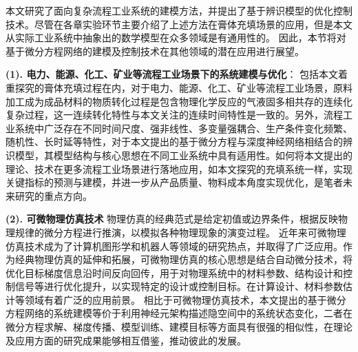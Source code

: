 
本文研究了面向复杂流程工业系统的建模方法，并提出了基于辨识模型的优化控制技术。尽管在各章实验环节主要介绍了上述方法在膏体充填场景的应用，但是本文从实际工业系统中抽象出的数学模型在众多领域是有通用性的。
因此，本节将对基于微分方程网络的建模及控制技术在其他领域的潜在应用进行展望。

\textbf{(1). 电力、能源、化工、矿业等流程工业场景下的系统建模与优化}：
包括本文着重探究的膏体充填过程在内，对于电力、能源、化工、矿业等流程工业场景，原料加工成为成品材料的物质转化过程是包含物理化学反应的气液固多相共存的连续化复杂过程，这一连续转化特性与本文关注的连续时间特性是一致的。另外，流程工业系统中广泛存在不同时间尺度、强非线性、多变量强耦合、生产条件变化频繁、随机性、长时延等特性，对于本文提出的基于微分方程与深度神经网络相结合的辨识模型，其模型结构与核心思想在不同工业系统中具有适用性。如何将本文提出的理论、技术在更多流程工业场景进行落地应用，如本文探究的充填系统一样，实现关键指标的预测与建模，并进一步从产品质量、物料成本角度实现优化，是笔者未来研究的重点方向。

\textbf{(2). 可微物理仿真技术}
物理仿真的经典范式是给定初值或边界条件，根据反映物理规律的微分方程进行推演，以模拟各种物理现象的演变过程。
近年来可微物理仿真技术成为了计算机图形学和机器人等领域的研究热点，并取得了广泛应用。作为经典物理仿真的延伸和拓展，可微物理仿真的核心思想是结合自动微分技术，将优化目标梯度信息沿时间反向回传，用于对物理系统中的材料参数、结构设计和控制信号等进行优化提升，以实现特定的设计或控制目标。在计算设计、材料参数估计等领域有着广泛的应用前景。
相比于可微物理仿真技术，本文提出的基于微分方程网络的系统建模等价于利用神经元架构描述隐空间中的系统状态变化，二者在微分方程求解、梯度传播、模型训练、建模目标等方面具有很强的相似性，在理论及应用方面的研究成果能够相互借鉴，推动彼此的发展。

